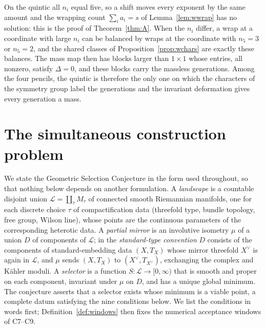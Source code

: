 \begin{remark}\label{rem:wquintic}
On the quintic all $n_i$ equal five, so a shift moves every exponent by the
same amount and the wrapping count $\sum_ia_i=s$ of
Lemma~\ref{lem:wwrap} has no solution: this is the proof of
Theorem~\ref{thm:A}. When the $n_i$ differ, a wrap at a coordinate with
large $n_i$ can be balanced by wraps at the coordinate with $n_5=3$ or
$n_5=2$, and the shared classes of Proposition~\ref{prop:wchars} are
exactly these balances. The mass map then has blocks larger than $1\times1$
whose entries, all nonzero, satisfy $\Delta=0$, and these blocks carry the
massless generations. Among the four pencils, the quintic is therefore the
only one on which the characters of the symmetry group label the
generations and the invariant deformation gives every generation a mass.
\end{remark}



\section{The simultaneous construction problem}\label{sec:selection}
We state the Geometric Selection Conjecture in the form used throughout,
so that nothing below depends on another formulation. A \emph{landscape}
is a countable disjoint union $\mathcal L=\coprod_\tau M_\tau$ of
connected smooth Riemannian manifolds, one for each discrete choice $\tau$
of compactification data (threefold type, bundle topology, free group,
Wilson line), whose points are the continuous parameters of the
corresponding heterotic data. A \emph{partial mirror} is an involutive
isometry $\mu$ of a union $D$ of components of $\mathcal L$; in the
\emph{standard-type convention} $D$ consists of the components of
standard-embedding data $(X,T_X)$ whose mirror threefold $X^\vee$ is again
in $\mathcal L$, and $\mu$ sends $(X,T_X)$ to $(X^\vee,T_{X^\vee})$,
exchanging the complex and K\"ahler moduli. A \emph{selector} is a
function $S\colon\mathcal L\to[0,\infty)$ that is smooth and proper on
each component, invariant under $\mu$ on $D$, and has a unique global
minimum. The conjecture asserts that a selector exists whose minimum is
a viable point, a complete datum satisfying the nine conditions below. We
list the conditions in words first; Definition~\ref{def:windows} then
fixes the numerical acceptance windows of C7--C9.

